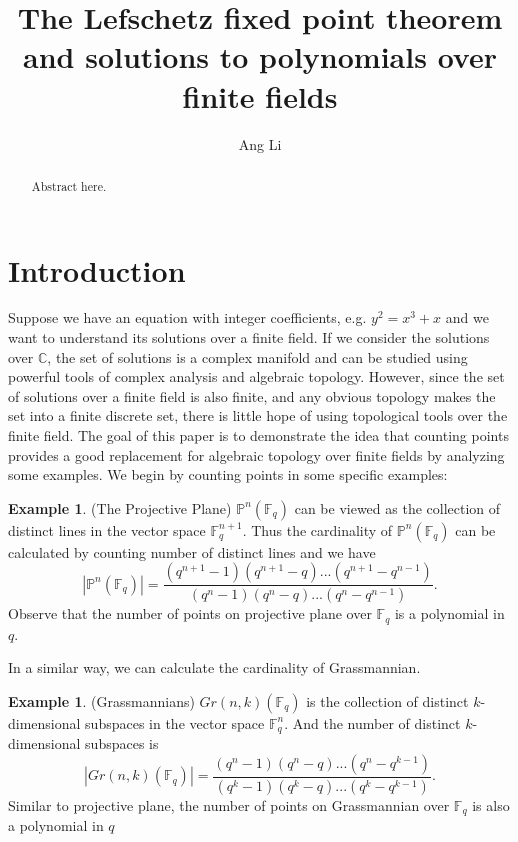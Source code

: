 \documentclass[psamsfonts]{amsart}
\title{The Lefschetz fixed point theorem and  solutions to polynomials over finite fields}
\author{Ang Li}
\theoremstyle{definition}
\newtheorem{exmp}[theorem]{Example}
\theoremstyle{remark}
\numberwithin{equation}{section}
\begin{document}
	\begin{abstract}
		Abstract here.
	\end{abstract}

	\maketitle
	
	\tableofcontents
	
	\section{Introduction}
		Suppose we have an equation with integer coefficients, e.g. $y^2 = x^3 + x$ and we want to understand its solutions over a finite field. If we consider the solutions over $\mathbb{C}$, the set of solutions is a complex manifold and can be studied using powerful tools of complex analysis and algebraic topology. However, since the set of solutions over a finite field is also finite, and any obvious topology makes the set into a finite discrete set, there is little hope of using topological tools over the finite field. The goal of this paper is to demonstrate the idea that counting points provides a good replacement for algebraic topology over finite fields by analyzing some examples. We begin by counting points in some specific examples:
		
		\begin{exmp}(The Projective Plane)
			$\mathbb{P}^n(\mathbb{F}_q)$ can be viewed as the collection of distinct lines in the vector space $\mathbb{F}_q^{n+1}$. Thus the cardinality of $\mathbb{P}^n(\mathbb{F}_q)$ can be calculated by counting number of distinct lines and we have
			\begin{equation}
				|\mathbb{P}^n(\mathbb{F}_q)| = \frac{(q^{n+1}-1)(q^{n+1}-q)...(q^{n+1}-q^{n-1})}{(q^n-1)(q^n-q)...(q^n - q^{n-1})}.
			\end{equation}
			Observe that the number of points on  projective plane over $\mathbb{F}_q$ is a polynomial in $q$.
		\end{exmp}
		
		In a similar way, we can calculate the cardinality of Grassmannian.
		\begin{exmp}(Grassmannians)
			$Gr(n,k)(\mathbb{F}_q)$ is the collection of distinct $k$-dimensional subspaces in the vector space $\mathbb{F}_q^n$. And the number of distinct $k$-dimensional subspaces is
			\begin{equation}
				|Gr(n,k)(\mathbb{F}_q)| = \frac{(q^n-1)(q^n-q)...(q^n-q^{k-1})}{(q^k-1)(q^k - q)...(q^k-q^{k-1})}.
			\end{equation}
			Similar to projective plane, the number of points on Grassmannian over 
			$\mathbb{F}_q$ is also a polynomial in $q$
		\end{exmp}
		
\end{document}

